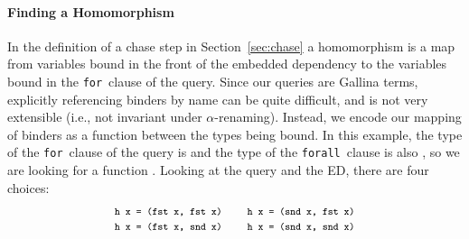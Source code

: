 \documentclass[preprint]{sigplanconf}
\newcommand{\FOR}{{\tt for}\relax\ifmmode\ \else\xspace\fi}
\newcommand{\FORALL}{{\tt forall}\relax\ifmmode\ \else\xspace\fi}
\begin{document}
\paragraph{Finding a Homomorphism}
In the definition of a chase step in Section~\ref{sec:chase} a homomorphism is a map from variables bound in the front of the embedded dependency to the variables bound in the \FOR clause of the query.
Since our queries are Gallina terms, explicitly referencing binders by name can be quite difficult, and is not very extensible (i.e., not invariant under $\alpha$-renaming).
Instead, we encode our mapping of binders as a function between the types being bound.
In this example, the type of the \FOR clause of the query is  and the type of the \FORALL clause is also , so we are looking for a function .
Looking at the query and the ED, there are four choices:
\[\begin{array}{lcl}
\footnotesize\texttt{h x = (fst x, fst x)} & & \footnotesize\texttt{h x = (snd x, fst x)} \\
\footnotesize\texttt{h x = (fst x, snd x)} & & \footnotesize\texttt{h x = (snd x, snd x)} \\
\end{array}
\]
\end{document}
